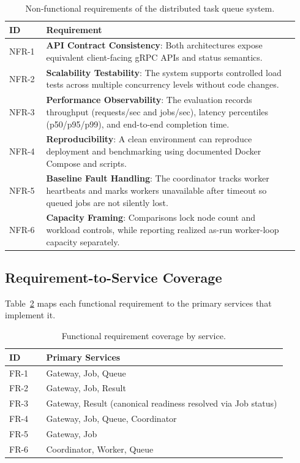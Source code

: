 \documentclass[11pt]{article}
\begin{document}
\begin{table}[H]
\centering
\caption{Non-functional requirements of the distributed task queue system.}
\label{tab:nonfunctional-requirements}
\begin{tabular}{p{0.12\linewidth} p{0.82\linewidth}}
\toprule
\textbf{ID} & \textbf{Requirement} \\
\midrule
NFR-1 & \textbf{API Contract Consistency}: Both architectures expose equivalent client-facing gRPC APIs and status semantics. \\
NFR-2 & \textbf{Scalability Testability}: The system supports controlled load tests across multiple concurrency levels without code changes. \\
NFR-3 & \textbf{Performance Observability}: The evaluation records throughput (requests/sec and jobs/sec), latency percentiles (p50/p95/p99), and end-to-end completion time. \\
NFR-4 & \textbf{Reproducibility}: A clean environment can reproduce deployment and benchmarking using documented Docker Compose and scripts. \\
NFR-5 & \textbf{Baseline Fault Handling}: The coordinator tracks worker heartbeats and marks workers unavailable after timeout so queued jobs are not silently lost. \\
NFR-6 & \textbf{Capacity Framing}: Comparisons lock node count and workload controls, while reporting realized as-run worker-loop capacity separately. \\
\bottomrule
\end{tabular}
\end{table}


\subsection{Requirement-to-Service Coverage}
Table~\ref{tab:fr-service-map} maps each functional requirement to the primary services that implement it.

\begin{table}[H]
\centering
\caption{Functional requirement coverage by service.}
\label{tab:fr-service-map}
\begin{tabular}{p{0.12\linewidth} p{0.78\linewidth}}
\toprule
\textbf{ID} & \textbf{Primary Services} \\
\midrule
FR-1 & Gateway, Job, Queue \\
FR-2 & Gateway, Job, Result \\
FR-3 & Gateway, Result (canonical readiness resolved via Job status) \\
FR-4 & Gateway, Job, Queue, Coordinator \\
FR-5 & Gateway, Job \\
FR-6 & Coordinator, Worker, Queue \\
\bottomrule
\end{tabular}
\end{table}
\end{document}
